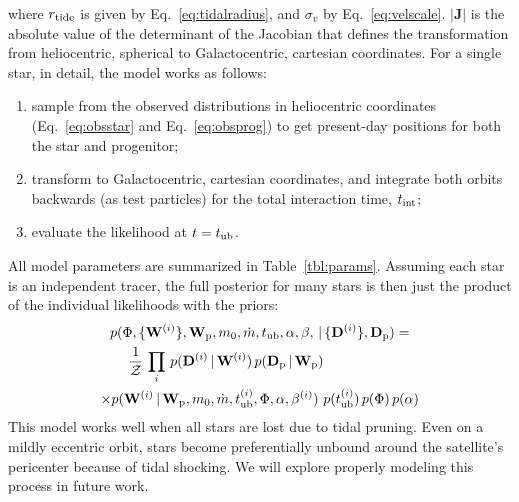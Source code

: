 \documentclass[letterpaper,12pt,preprint]{aastex}
\newcommand{\given}{\,|\,}
\newcommand{\D}{{\bf D}}
\newcommand{\W}{{\bf W}}
\newcommand{\J}{{\boldsymbol J}}
\newcommand{\rtide}{r_{\rm tide}}
\newcommand{\sat}{{\rm p}}
\newcommand{\tub}{t_{\rm ub}}
\newcommand{\tint}{t_{\rm int}}
\newcommand{\tailbit}{\beta}
\newcommand{\Loffset}{\alpha}
\begin{document}
where $\rtide$ is given by Eq.~\ref{eq:tidalradius}, and $\sigma_v$ by Eq.~\ref{eq:velscale}. $\left\vert\J\right\vert$ is the absolute value of the determinant of the Jacobian that defines the transformation from heliocentric, spherical to Galactocentric, cartesian coordinates. For a single star, in detail, the model works as follows:
\begin{enumerate}
	\item sample from the observed distributions in heliocentric coordinates (Eq.~\ref{eq:obsstar} and Eq.~\ref{eq:obsprog}) to get present-day positions for both the star and progenitor;
	\item transform to Galactocentric, cartesian coordinates, and integrate both orbits backwards (as test particles) for the total interaction time, $\tint$;
	\item evaluate the likelihood at $t=\tub$.
\end{enumerate}
All model parameters are summarized in Table~\ref{tbl:params}. Assuming each star is an independent tracer, the full posterior for many stars is then just the product of the individual likelihoods with the priors:
\begin{multline}
	p(\Phi, \{\W^{(i)}\}, \W_\sat, m_0, \dot{m}, \tub, \Loffset, \tailbit, \given \{\D^{(i)}\}, \D_\sat) = \\
		\shoveleft{\hspace{1em}\frac{1}{\mathcal{Z}} \, \prod_i \, p(\D^{(i)} \given \W^{(i)}) \, p(\D_\sat \given \W_\sat)}\\
			\times p(\W^{(i)} \given \W_\sat, m_0, \dot{m}, \tub^{(i)}, \Phi, \Loffset, \tailbit^{(i)}) \, 
			\, p(\tub^{(i)}) \, p(\Phi) \, p(\Loffset)
\end{multline}
This model works well when all stars are lost due to tidal pruning. Even on a mildly eccentric orbit, stars become preferentially unbound around the satellite's pericenter because of tidal shocking. We will explore properly modeling this process in future work. 
\end{document}

